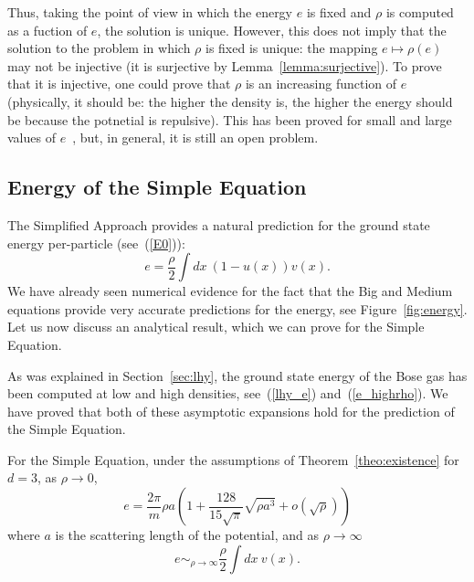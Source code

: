 \documentclass{ian}
\begin{document}
\indent
Thus, taking the point of view in which the energy $e$ is fixed and $\rho$ is computed as a fuction of $e$, the solution is unique.
However, this does not imply that the solution to the problem in which $\rho$ is fixed is unique: the mapping $e\mapsto\rho(e)$ may not be injective (it is surjective by Lemma\-~\ref{lemma:surjective}).
To prove that it is injective, one could prove that $\rho$ is an increasing function of $e$ (physically, it should be: the higher the density is, the higher the energy should be because the potnetial is repulsive).
This has been proved for small and large values of $e$\-~\cite{CJL21}, but, in general, it is still an open problem.

\subsection{Energy of the Simple Equation}
\indent
The Simplified Approach provides a natural prediction for the ground state energy per-particle (see\-~(\ref{E0})):
\begin{equation}
  e=\frac\rho2\int dx\ (1-u(x))v(x)
  .
\end{equation}
We have already seen numerical evidence for the fact that the Big and Medium equations provide very accurate predictions for the energy, see Figure\-~\ref{fig:energy}.
Let us now discuss an analytical result, which we can prove for the Simple Equation.
\bigskip

\indent
As was explained in Section\-~\ref{sec:lhy}, the ground state energy of the Bose gas has been computed at low and high densities, see\-~(\ref{lhy_e}) and\-~(\ref{e_highrho}).
We have proved that both of these asymptotic expansions hold for the prediction of the Simple Equation.
\bigskip

\label{theo:energy}
  For the Simple Equation, under the assumptions of Theorem\-~\ref{theo:existence} for $d=3$, as $\rho\to0$,
  \begin{equation}
    e=\frac{2\pi}m\rho a\left(1+\frac{128}{15\sqrt\pi}\sqrt{\rho a^3}+o(\sqrt\rho)\right)
    \label{low_density}
  \end{equation}
  where $a$ is the scattering length of the potential, and as $\rho\to\infty$
  \nopagebreakaftereq
  \begin{equation}
    e\sim_{\rho\to\infty}\frac\rho2\int dx\ v(x)
    .
    \label{high_density}
  \end{equation}
\endtheo
\restorepagebreakaftereq
\bigskip
\end{document}
